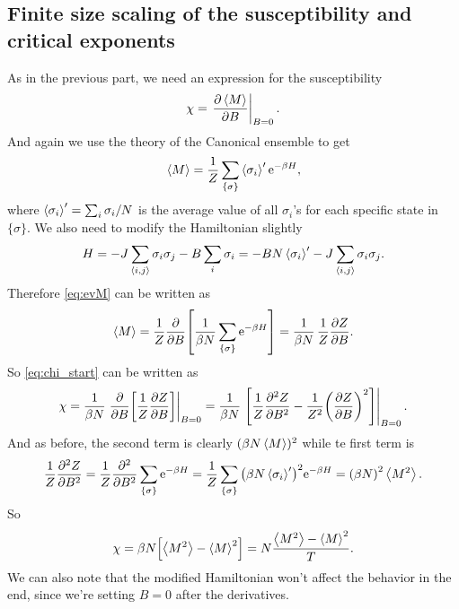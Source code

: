 \documentclass[11pt,letter, swedish, english
]{article}
\begin{document}
\subsection{Finite size scaling of the susceptibility and critical exponents}
As in the previous part, we need an expression for the susceptibility
\begin{equation}\label{eq:chi_start}
\chi = \eval{\pdv{\ev{M}}{B}}_{B=0}.
\end{equation}
And again we use the theory of the Canonical ensemble to get
\begin{equation}\label{eq:evM}
\ev{M} = \frac{1}{Z}\sum_{\{\sigma\}} \ev{\sigma_i}'\ee^{-\beta H},
\end{equation}
where $\ev{\sigma_i}' = \sum_i\sigma_i/N$ is the
average\footnotemark{} value of all $\sigma_i$'s for each specific
state in $\{\sigma\}$. We also need to modify the Hamiltonian slightly 
\begin{equation}
H = -J\sum_{\ev{i, j}} \sigma_i\sigma_j
-B\sum_{i} \sigma_i
=-BN\ev{\sigma_i}' -J\sum_{\ev{i, j}} \sigma_i\sigma_j.
\end{equation}
Therefore \eqref{eq:evM} can be written as
\begin{equation}
\ev{M} = \frac{1}{Z} 
\pdv{B}\qty[\frac{1}{\beta N}\sum_{\{\sigma\}}\ee^{-\beta H}]
=\frac{1}{\beta N}\,\frac{1}{Z}\pdv{Z}{B}.
\end{equation}
So \eqref{eq:chi_start} can be written as
\begin{equation}
\chi = \frac{1}{\beta N} 
\eval{\pdv{B}\qty[\frac{1}{Z}\pdv{Z}{B}]}_{B=0}
=\frac{1}{\beta N} 
\eval{\qty[\frac{1}{Z}\pdv[2]{Z}{B}
-\frac{1}{Z^2}\qty(\pdv{Z}{B})^2]}_{B=0}.
\end{equation}
And as before, the second term is clearly $(\beta N\ev{M})^2$ while te
first term is
\begin{equation}
\frac{1}{Z}\pdv[2]{Z}{B}
=\frac{1}{Z}\pdv[2]{B}\sum_{\{\sigma\}}\ee^{-\beta H}
=\frac{1}{Z}\sum_{\{\sigma\}}
\qty(\beta N\ev{\sigma_i}')^2\ee^{-\beta H}
=\qty(\beta N)^2\ev{M^2}.
\end{equation}
So
\begin{equation}\label{eq:chi}
\chi =\beta N \qty[\ev{M^2} - \ev{M}^2]
=N \frac{\ev{M^2} - \ev{M}^2}{T}.
\end{equation}
We can also note that the modified Hamiltonian won't affect the
behavior in the end, since we're setting $B=0$ after the derivatives.
\end{document}
